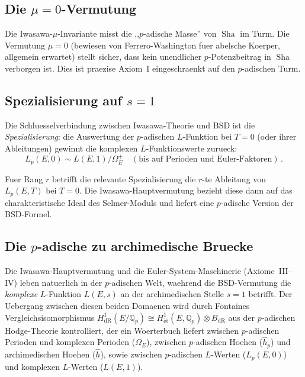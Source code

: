 \documentclass[aps,prd,twocolumn,superscriptaddress,nofootinbib]{revtex4-2}
\theoremstyle{definition}
\theoremstyle{remark}
\DeclareMathOperator{\Sha}{Sha}
\begin{document}
\subsection{Die $\mu = 0$-Vermutung}

Die Iwasawa-$\mu$-Invariante misst die ,,$p$-adische Masse'' von $\Sha$ im Turm. Die Vermutung $\mu = 0$ (bewiesen von Ferrero-Washington fuer abelsche Koerper, allgemein erwartet) stellt sicher, dass kein unendlicher $p$-Potenzbeitrag in $\Sha$ verborgen ist. Dies ist praezise Axiom~I eingeschraenkt auf den $p$-adischen Turm.

\subsection{Spezialisierung auf $s = 1$}

Die Schluesselverbindung zwischen Iwasawa-Theorie und BSD ist die \textit{Spezialisierung}: die Auswertung der $p$-adischen $L$-Funktion bei $T = 0$ (oder ihrer Ableitungen) gewinnt die komplexen $L$-Funktionswerte zurueck:
\begin{equation}
L_p(E, 0) \sim L(E, 1)/\Omega_E^+ \quad (\text{bis auf Perioden und Euler-Faktoren})\,.
\end{equation}

Fuer Rang $r$ betrifft die relevante Spezialisierung die $r$-te Ableitung von $L_p(E, T)$ bei $T = 0$. Die Iwasawa-Hauptvermutung bezieht diese dann auf das charakteristische Ideal des Selmer-Moduls und liefert eine $p$-adische Version der BSD-Formel.

\subsection{Die $p$-adische zu archimedische Bruecke}
\label{sec:p-adic-bridge}

Die Iwasawa-Hauptvermutung und die Euler-System-Maschinerie (Axiome~III--IV) leben natuerlich in der $p$-adischen Welt, waehrend die BSD-Vermutung die \textit{komplexe} $L$-Funktion $L(E,s)$ an der archimedischen Stelle $s = 1$ betrifft. Der Uebergang zwischen diesen beiden Domaenen wird durch Fontaines Vergleichsisomorphismus $H^1_{\mathrm{dR}}(E/\mathbb{Q}_p) \cong H^1_{\mathrm{\acute{e}t}}(E, \mathbb{Q}_p) \otimes B_{\mathrm{dR}}$ aus der $p$-adischen Hodge-Theorie kontrolliert, der ein Woerterbuch liefert zwischen $p$-adischen Perioden und komplexen Perioden ($\Omega_E$), zwischen $p$-adischen Hoehen ($\hat{h}_p$) und archimedischen Hoehen ($\hat{h}$), sowie zwischen $p$-adischen $L$-Werten ($L_p(E,0)$) und komplexen $L$-Werten ($L(E,1)$).
\end{document}
